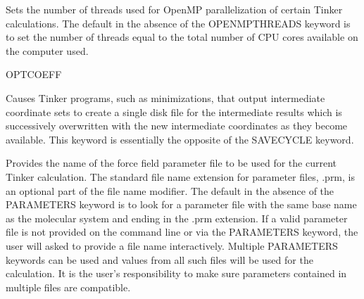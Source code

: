 \documentclass[letterpaper,11pt,english]{sphinxmanual}
\begin{document}
\ignorespaces {}\label{\detokenize{text/keywords:key-openmp-threads}}\begin{description}
\sphinxAtStartPar
Sets the number of threads used for OpenMP parallelization of certain Tinker calculations. The default in the absence of the OPENMP\sphinxhyphen{}THREADS keyword is to set the number of threads equal to the total number of CPU cores available on the computer used.

\end{description}

\ignorespaces {}\label{\detokenize{text/keywords:key-opt-coeff}}
\sphinxAtStartPar
OPT\sphinxhyphen{}COEFF

\ignorespaces {}\label{\detokenize{text/keywords:key-overwrite}}\begin{description}
\sphinxAtStartPar
Causes Tinker programs, such as minimizations, that output intermediate coordinate sets to create a single disk file for the intermediate results which is successively overwritten with the new intermediate coordinates as they become available. This keyword is essentially the opposite of the SAVECYCLE keyword.

\end{description}

\ignorespaces {}\label{\detokenize{text/keywords:key-parameters}}\begin{description}
\sphinxAtStartPar
Provides the name of the force field parameter file to be used for the current Tinker calculation. The standard file name extension for parameter files, .prm, is an optional part of the file name modifier. The default in the absence of the PARAMETERS keyword is to look for a parameter file with the same base name as the molecular system and ending in the .prm extension. If a valid parameter file is not provided on the command line or via the PARAMETERS keyword, the user will asked to provide a file name interactively. Multiple PARAMETERS keywords can be used and values from all such files will be used for the calculation. It is the user’s responsibility to make sure parameters contained in multiple files are compatible.

\end{description}
\end{document}
